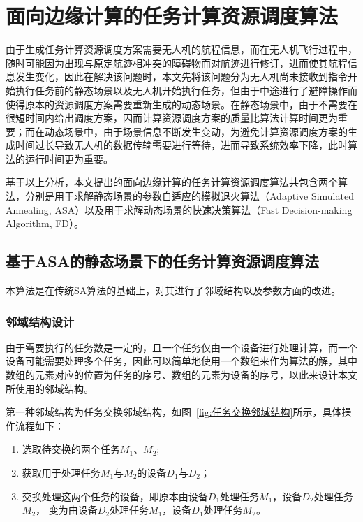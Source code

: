 \section{面向边缘计算的任务计算资源调度算法}

由于生成任务计算资源调度方案需要无人机的航程信息，而在无人机飞行过程中，随时可能因为出现与原定航迹相冲突的障碍物而对航迹进行修订，进而使其航程信息发生变化，因此在解决该问题时，本文先将该问题分为无人机尚未接收到指令开始执行任务前的静态场景以及无人机开始执行任务，但由于中途进行了避障操作而使得原本的资源调度方案需要重新生成的动态场景。在静态场景中，由于不需要在很短时间内给出调度方案，因而计算资源调度方案的质量比算法计算时间更为重要；而在动态场景中，由于场景信息不断发生变动，为避免计算资源调度方案的生成时间过长导致无人机的数据传输需要进行等待，进而导致系统效率下降，此时算法的运行时间更为重要。

基于以上分析，本文提出的面向边缘计算的任务计算资源调度算法共包含两个算法，分别是用于求解静态场景的参数自适应的模拟退火算法（Adaptive Simulated Annealing, ASA）以及用于求解动态场景的快速决策算法（Fast Decision-making Algorithm, FD）。

\subsection{基于ASA的静态场景下的任务计算资源调度算法}

本算法是在传统SA算法的基础上，对其进行了邻域结构以及参数方面的改进。

\subsubsection{邻域结构设计} \label{sec:neighbor_design}

由于需要执行的任务数是一定的，且一个任务仅由一个设备进行处理计算，而一个设备可能需要处理多个任务，因此可以简单地使用一个数组来作为算法的解，其中数组的元素对应的位置为任务的序号、数组的元素为设备的序号，以此来设计本文所使用的邻域结构。

第一种邻域结构为任务交换邻域结构，如图~\ref{fig:任务交换邻域结构}所示，具体操作流程如下：

\begin{enumerate}[label=(\arabic*)]
    \item {选取待交换的两个任务\(M_1\)、\(M_2\);}
    \item {获取用于处理任务\(M_1\)与\(M_2\)的设备\(D_1\)与\(D_2\)；}
    \item {交换处理这两个任务的设备，即原本由设备\(D_1\)处理任务\(M_1\)，设备\(D_2\)处理任务\(M_2\)，
    变为由设备\(D_2\)处理任务\(M_1\)，设备\(D_1\)处理任务\(M_2\)。}
\end{enumerate}

